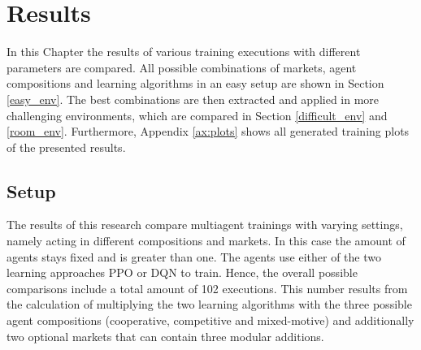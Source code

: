 %
%
\chapter{Results}\label{sec:Results}
In this Chapter the results of various training executions with different parameters are compared. All possible combinations of markets, agent compositions and learning algorithms in an easy setup are shown in Section \ref{easy_env}. The best combinations are then extracted and applied in more challenging environments, which are compared in Section \ref{difficult_env} and \ref{room_env}. Furthermore, Appendix \ref{ax:plots} shows all generated training plots of the presented results.

\section{Setup} \label{setup}

The results of this research compare multiagent trainings with varying settings, namely acting in different compositions and markets. In this case the amount of agents stays fixed and is greater than one. The agents use either of the two learning approaches PPO or DQN to train. Hence, the overall possible comparisons include a total amount of 102 executions. This number results from the calculation of multiplying the two learning algorithms with the three possible agent compositions (cooperative, competitive and mixed-motive) and additionally two optional markets that can contain three modular additions. 

